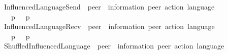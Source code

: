 \begin{isabellebody}
\isanewline
{}\isamarkupfalse%
\ InfluencedLanguageSend\ {\isacharcolon}{\kern0pt}{\isacharcolon}{\kern0pt}\ {\isachardoublequoteopen}{\isacharprime}{\kern0pt}peer\ {\isasymRightarrow}\ {\isacharparenleft}{\kern0pt}{\isacharprime}{\kern0pt}information{\isacharcomma}{\kern0pt}\ {\isacharprime}{\kern0pt}peer{\isacharparenright}{\kern0pt}\ action\ language{\isachardoublequoteclose}\ \ {\isacharparenleft}{\kern0pt}{\isachardoublequoteopen}{\isasymL}\isactrlsub {\isacharbang}{\kern0pt}\isactrlsup {\isacharasterisk}{\kern0pt}\ {\isacharunderscore}{\kern0pt}{\isachardoublequoteclose}\ {\isacharbrackleft}{\kern0pt}{}{}{\isacharbrackright}{\kern0pt}\ {}{}{}{\isacharparenright}{\kern0pt}\ \isanewline
\ \ {\isachardoublequoteopen}{\isasymL}\isactrlsub {\isacharbang}{\kern0pt}\isactrlsup {\isacharasterisk}{\kern0pt}\ p\ {\isasymequiv}\ {\isacharparenleft}{\kern0pt}{\isasymL}\isactrlsup {\isacharasterisk}{\kern0pt}\ p{\isacharparenright}{\kern0pt}{\isasymdownharpoonright}\isactrlsub {\isacharbang}{\kern0pt}\ {\isachardoublequoteclose}\isanewline
\isanewline
{}\isamarkupfalse%
\ InfluencedLanguageRecv\ {\isacharcolon}{\kern0pt}{\isacharcolon}{\kern0pt}\ {\isachardoublequoteopen}{\isacharprime}{\kern0pt}peer\ {\isasymRightarrow}\ {\isacharparenleft}{\kern0pt}{\isacharprime}{\kern0pt}information{\isacharcomma}{\kern0pt}\ {\isacharprime}{\kern0pt}peer{\isacharparenright}{\kern0pt}\ action\ language{\isachardoublequoteclose}\ \ {\isacharparenleft}{\kern0pt}{\isachardoublequoteopen}{\isasymL}\isactrlsub {\isacharquery}{\kern0pt}\isactrlsup {\isacharasterisk}{\kern0pt}\ {\isacharunderscore}{\kern0pt}{\isachardoublequoteclose}\ {\isacharbrackleft}{\kern0pt}{}{}{\isacharbrackright}{\kern0pt}\ {}{}{}{\isacharparenright}{\kern0pt}\ \isanewline
\ \ {\isachardoublequoteopen}{\isasymL}\isactrlsub {\isacharquery}{\kern0pt}\isactrlsup {\isacharasterisk}{\kern0pt}\ p\ {\isasymequiv}\ {\isacharparenleft}{\kern0pt}{\isasymL}\isactrlsup {\isacharasterisk}{\kern0pt}\ p{\isacharparenright}{\kern0pt}{\isasymdownharpoonright}\isactrlsub {\isacharquery}{\kern0pt}\ {\isachardoublequoteclose}\isanewline
\isanewline
{}\isamarkupfalse%
\ ShuffledInfluencedLanguage\ {\isacharcolon}{\kern0pt}{\isacharcolon}{\kern0pt}\ {\isachardoublequoteopen}{\isacharprime}{\kern0pt}peer\ {\isasymRightarrow}\ {\isacharparenleft}{\kern0pt}{\isacharprime}{\kern0pt}information{\isacharcomma}{\kern0pt}\ {\isacharprime}{\kern0pt}peer{\isacharparenright}{\kern0pt}\ action\ language{\isachardoublequoteclose}\ {\isacharparenleft}{\kern0pt}{\isachardoublequoteopen}{\isasymL}\isactrlsup {\isacharasterisk}{\kern0pt}\isactrlsub {\isasymsqunion}\isactrlsub {\isasymsqunion}\ {\isacharunderscore}{\kern0pt}{\isachardoublequoteclose}\ {\isacharbrackleft}{\kern0pt}{}{}{\isacharbrackright}{\kern0pt}\ {}{}{}{\isacharparenright}{\kern0pt}\ \isanewline

\end{isabellebody}
